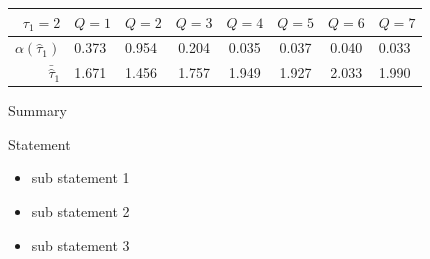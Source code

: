\documentclass{beamer}
\begin{document}

\begin{frame} %


\begin{center}



\begin{tabular}{rggccccg}
  \hline
\textcolor{lightmaroon1}{\scriptsize{$\tau_1=2$}}  & $Q=1$ & $Q=2$ & $Q=3$ & $Q=4$ & $Q=5$ & $Q=6$ & $Q=7$ \\ 
  \hline
$\alpha \left( \hat{\tau}_1 \right)$ & 0.373 & 0.954 & 0.204 & 0.035 & 0.037 & 0.040 & 0.033 \\ 
  $\bar{\hat{\tau}}_1$ & 1.671 & 1.456 & 1.757 & 1.949 & 1.927 & 2.033 & 1.990 \\ 
   \hline
\end{tabular}


\end{center}


\end{frame}




\begin{frame}{Summary}

Statement
\begin{itemize}
\item sub statement 1
\item sub statement 2
\item sub statement 3
\end{itemize}


\end{frame}

\end{document}
